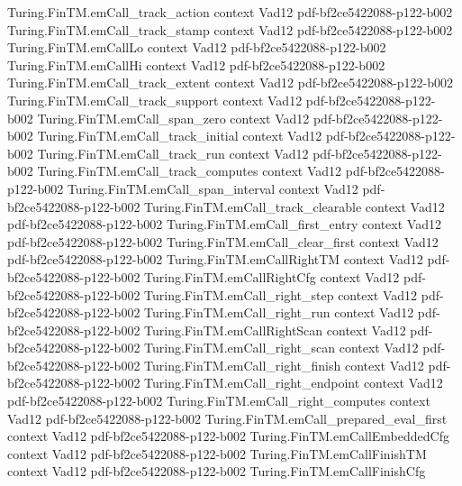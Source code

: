 \begin{theorem}
\proofstep
  {Turing.FinTM.emCall_track_action}
  {context}
  {Vad12}
  {pdf-bf2ce5422088-p122-b002}
\proofstep
  {Turing.FinTM.emCall_track_stamp}
  {context}
  {Vad12}
  {pdf-bf2ce5422088-p122-b002}
\proofstep
  {Turing.FinTM.emCallLo}
  {context}
  {Vad12}
  {pdf-bf2ce5422088-p122-b002}
\proofstep
  {Turing.FinTM.emCallHi}
  {context}
  {Vad12}
  {pdf-bf2ce5422088-p122-b002}
\proofstep
  {Turing.FinTM.emCall_track_extent}
  {context}
  {Vad12}
  {pdf-bf2ce5422088-p122-b002}
\proofstep
  {Turing.FinTM.emCall_track_support}
  {context}
  {Vad12}
  {pdf-bf2ce5422088-p122-b002}
\proofstep
  {Turing.FinTM.emCall_span_zero}
  {context}
  {Vad12}
  {pdf-bf2ce5422088-p122-b002}
\proofstep
  {Turing.FinTM.emCall_track_initial}
  {context}
  {Vad12}
  {pdf-bf2ce5422088-p122-b002}
\proofstep
  {Turing.FinTM.emCall_track_run}
  {context}
  {Vad12}
  {pdf-bf2ce5422088-p122-b002}
\proofstep
  {Turing.FinTM.emCall_track_computes}
  {context}
  {Vad12}
  {pdf-bf2ce5422088-p122-b002}
\proofstep
  {Turing.FinTM.emCall_span_interval}
  {context}
  {Vad12}
  {pdf-bf2ce5422088-p122-b002}
\proofstep
  {Turing.FinTM.emCall_track_clearable}
  {context}
  {Vad12}
  {pdf-bf2ce5422088-p122-b002}
\proofstep
  {Turing.FinTM.emCall_first_entry}
  {context}
  {Vad12}
  {pdf-bf2ce5422088-p122-b002}
\proofstep
  {Turing.FinTM.emCall_clear_first}
  {context}
  {Vad12}
  {pdf-bf2ce5422088-p122-b002}
\proofstep
  {Turing.FinTM.emCallRightTM}
  {context}
  {Vad12}
  {pdf-bf2ce5422088-p122-b002}
\proofstep
  {Turing.FinTM.emCallRightCfg}
  {context}
  {Vad12}
  {pdf-bf2ce5422088-p122-b002}
\proofstep
  {Turing.FinTM.emCall_right_step}
  {context}
  {Vad12}
  {pdf-bf2ce5422088-p122-b002}
\proofstep
  {Turing.FinTM.emCall_right_run}
  {context}
  {Vad12}
  {pdf-bf2ce5422088-p122-b002}
\proofstep
  {Turing.FinTM.emCallRightScan}
  {context}
  {Vad12}
  {pdf-bf2ce5422088-p122-b002}
\proofstep
  {Turing.FinTM.emCall_right_scan}
  {context}
  {Vad12}
  {pdf-bf2ce5422088-p122-b002}
\proofstep
  {Turing.FinTM.emCall_right_finish}
  {context}
  {Vad12}
  {pdf-bf2ce5422088-p122-b002}
\proofstep
  {Turing.FinTM.emCall_right_endpoint}
  {context}
  {Vad12}
  {pdf-bf2ce5422088-p122-b002}
\proofstep
  {Turing.FinTM.emCall_right_computes}
  {context}
  {Vad12}
  {pdf-bf2ce5422088-p122-b002}
\proofstep
  {Turing.FinTM.emCall_prepared_eval_first}
  {context}
  {Vad12}
  {pdf-bf2ce5422088-p122-b002}
\proofstep
  {Turing.FinTM.emCallEmbeddedCfg}
  {context}
  {Vad12}
  {pdf-bf2ce5422088-p122-b002}
\proofstep
  {Turing.FinTM.emCallFinishTM}
  {context}
  {Vad12}
  {pdf-bf2ce5422088-p122-b002}
\proofstep
  {Turing.FinTM.emCallFinishCfg}

\end{theorem}
